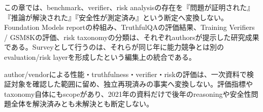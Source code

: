 この章では、benchmark、verifier、risk analysisの存在を『問題が証明された』『推論が解決された』『安全性が測定済み』という断定へ変換しない。Foundation Models reportの枠組み、TruthfulQAの評価結果、Training Verifiers / GSM8Kの評価、risk taxonomyの分類は、それぞれauthorsが提示した研究成果である。Surveyとして行うのは、それらが同じ年に能力競争とは別のevaluation/risk layerを形成したという編集上の統合である。\autocite{src-20fd9bba2e7a,src-34f845c1e710,src-750bc3eeb1bc,src-8536f9ceae6d,src-c16f4ae139bf,src-d9549fe4ff37}


\begin{claimboundary}
author/vendorによる性能・truthfulness・verifier・riskの評価は、一次資料で検証対象を確認した範囲に留め、独立再現済みの事実へ変換しない。評価指標やtaxonomy自体にもscopeがあり、2021年の資料だけで後年のreasoningや安全性問題全体を解決済みとも未解決とも断定しない。\autocite{src-20fd9bba2e7a,src-34f845c1e710,src-750bc3eeb1bc,src-8536f9ceae6d,src-c16f4ae139bf,src-d9549fe4ff37}
\end{claimboundary}
